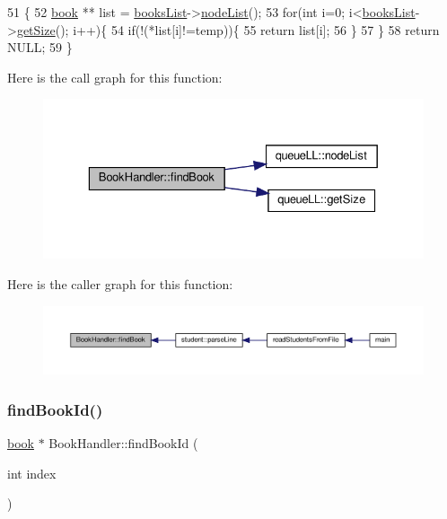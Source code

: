 \begin{DoxyCode}
51                                         \{
52     \hyperlink{classbook}{book} ** list = \hyperlink{class_book_handler_a13a6c78422b3ad7acd5ebdb9555a0286}{booksList}->\hyperlink{classqueue_l_l_ae9a479b9463f51c5148dd80b68335d32}{nodeList}();
53     \textcolor{keywordflow}{for}(\textcolor{keywordtype}{int} i=0; i<\hyperlink{class_book_handler_a13a6c78422b3ad7acd5ebdb9555a0286}{booksList}->\hyperlink{classqueue_l_l_a8969feebcb563f0b489bc112422b9563}{getSize}(); i++)\{
54         \textcolor{keywordflow}{if}(!(*list[i]!=temp))\{
55             \textcolor{keywordflow}{return} list[i];
56         \}
57     \}
58     \textcolor{keywordflow}{return} NULL;
59 \}
\end{DoxyCode}
Here is the call graph for this function\+:
\nopagebreak
\begin{figure}[H]
\begin{center}
\leavevmode
\includegraphics[width=329pt]{class_book_handler_aab461b060b38d51586ed043143b4bc68_cgraph}
\end{center}
\end{figure}
Here is the caller graph for this function\+:
\nopagebreak
\begin{figure}[H]
\begin{center}
\leavevmode
\includegraphics[width=350pt]{class_book_handler_aab461b060b38d51586ed043143b4bc68_icgraph}
\end{center}
\end{figure}
\mbox{\label{class_book_handler_ae82abc7349e19e59cd6f3cb23c7928fa}} 
\subsubsection{\texorpdfstring{find\+Book\+Id()}{findBookId()}}
{\footnotesize\ttfamily \hyperlink{classbook}{book} $\ast$ Book\+Handler\+::find\+Book\+Id (\begin{DoxyParamCaption}\item[{int}]{index }\end{DoxyParamCaption})}

